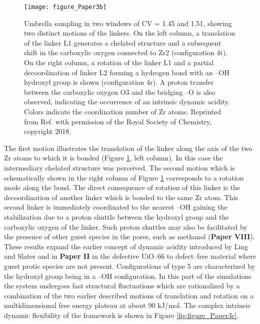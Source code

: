 \begin{figure}[!htp]
	\centering
	\texttt{[image: figure\_Paper3b]}
	\caption[Umbrella sampling in two windows of CV = 1.45 and 1.51, showing two
	distinct motions of the linkers. On the left column, a translation of the
	linker L1 generates a chelated structure and a subsequent shift in the
	carboxylic oxygen connected to Zr2 (configuration 4t). On the right column, a
	rotation of the linker L1 and a partial decoordination of linker L2 forming a
	hydrogen bond with an --OH hydroxyl group is shown
	(configuration 4r). A proton transfer between the carboxylic oxygen O3 and the
	bridging --O is also observed, indicating the occurrence of an
	intrinsic dynamic acidity. Colors indicate the coordination number of Zr atoms.]{Umbrella sampling in two windows of CV = 1.45 and 1.51, showing two
	distinct motions of the linkers. On the left column, a translation of the
	linker L1 generates a chelated structure and a subsequent shift in the
	carboxylic oxygen connected to Zr2 (configuration 4t). On the right column, a
	rotation of the linker L1 and a partial decoordination of linker L2 forming a
	hydrogen bond with an --OH hydroxyl group is shown
	(configuration 4r). A proton transfer between the carboxylic oxygen O3 and the
	bridging --O is also observed, indicating the occurrence of an
	intrinsic dynamic acidity. Colors indicate the coordination number of Zr atoms.
	Reprinted from Ref.\cite{Hajek2018} with permission of the Royal Society of
	Chemistry, copyright 2018.}
	\label{fig:figure_Paper3b}
\end{figure}
\npar
The first motion illustrates the
translation of the linker along the axis of the two Zr atoms to which it is
bonded (Figure \ref{fig:figure_Paper3b}, left column). In this case the intermediary chelated structure
was perceived. The second motion which is schematically shown in the right
column of Figure \ref{fig:figure_Paper3b} 
corresponds to a rotation mode along the  bond. The direct consequence
of rotation of this linker is the decoordination of another linker which is
bonded to the same Zr atom. This second linker is immediately coordinated to the
nearest --OH gaining the stabilization due to a proton shuttle between the hydroxyl group and the carboxylic oxygen of
the linker. Such proton shuttles may also be
facilitated by the presence of other guest species in the pores, such as
methanol (\textbf{Paper VIII}). These results expand the earlier concept of
dynamic acidity introduced by Ling and Slater \cite{Ling2016} and in
\textbf{Paper II} in the defective UiO--66 to defect--free material where guest
protic species are not present. Configurations of type 5 are characterized by the hydroxyl group being in a --OH
configuration. In this part of the simulations the system undergoes fast
structural fluctuations which are rationalized by a combination of the two
earlier described motions of translation and rotation on a multidimensional free
energy plateau at about 90 kJ/mol. The complex intrinsic dynamic flexibility of the framework is shown in Figure \ref{fig:figure_Paper3c}.

